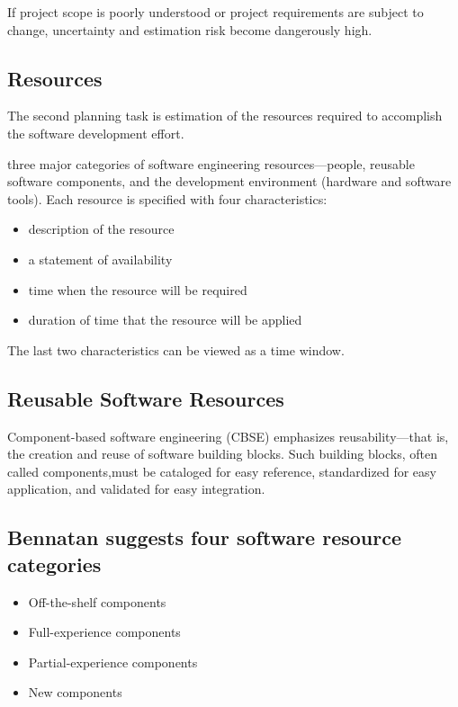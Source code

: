 \documentclass[12pt]{article}
\begin{document}
If project scope is poorly
understood or project requirements are subject to change, uncertainty and estimation
risk become dangerously high.

\newpage

\subsection{Resources}

The second planning task is estimation of the resources required to accomplish the
software development effort.

three major categories of software engineering resources—people, reusable software components, and the development environment (hardware and software tools). Each resource is specified with
four characteristics: 
\begin{itemize}
	\item description of the resource
	\item a statement of availability
	\item time when the resource will be required
	\item duration of time that the resource will be
applied
\end{itemize}

The last two characteristics can be viewed as a time window.





\subsection{Reusable Software Resources}

Component-based software engineering (CBSE) emphasizes reusability—that is, the
creation and reuse of software building blocks. Such building blocks, often called
components,must be cataloged for easy reference, standardized for easy application,
and validated for easy integration.


\subsection{Bennatan suggests four software
resource categories }

\begin{itemize}
	\item Off-the-shelf components 
	\item Full-experience components
	\item Partial-experience components
	\item New components
\end{itemize}
\end{document}
